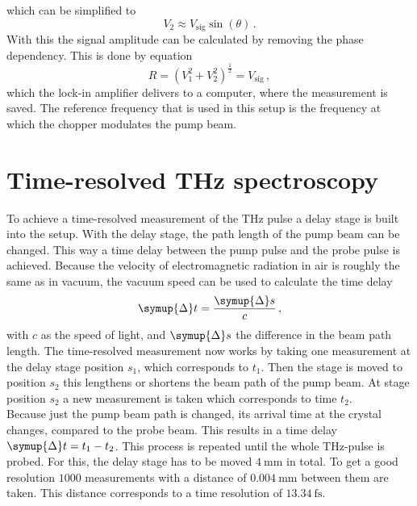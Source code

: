 which can be simplified to 
\begin{equation}
    V_2 \approx V_\text{sig} \sin(\theta)\,.
\end{equation}
With this the signal amplitude can be calculated by removing the phase dependency.
This is done by equation
\begin{equation}
    R = \left ( V_1^2+V_2^2 \right )^{\frac{1}{2}} = V_\text{sig} \, ,
\end{equation}
which the lock-in amplifier delivers to a computer, where the measurement is saved.
The reference frequency that is used in this setup is the frequency at which the chopper modulates the pump beam.
\section{Time-resolved THz spectroscopy}
\label{sec:time_domain}
To achieve a time-resolved measurement of the $\si{\tera\hertz}$ pulse a delay stage is built into the setup.
With the delay stage, the path length of the pump beam can be changed.
This way a time delay between the pump pulse and the probe pulse is achieved.
Because the velocity of electromagnetic radiation in air is roughly the same as in vacuum, the vacuum speed can be used to calculate the time delay   
\begin{equation}
    \symup{\Delta} t = \frac{\symup{\Delta} s}{c}\, ,
\end{equation}
with $c$ as the speed of light, and $\symup{\Delta} s$ the difference in the beam path length.
The time-resolved measurement now works by taking one measurement at the delay stage position $s_1$, which corresponds to $t_1$.
Then the stage is moved to position $s_2$ this lengthens or shortens the beam path of the pump beam.
At stage position $s_2$ a new measurement is taken which corresponds to time $t_2$.
\\
Because just the pump beam path is changed, its arrival time at the crystal changes, compared to the probe beam.
This results in a time delay $\symup{\Delta} t = t_1-t_2$.
This process is repeated until the whole $\si{\tera\hertz}$-pulse is probed.
For this, the delay stage has to be moved $\SI{4}{\milli\meter}$ in total.
To get a good resolution $1000$ measurements with a distance of $\SI{0.004}{\milli\meter}$ between them are taken.
This distance corresponds to a time resolution of $\SI{13.34}{\femto\second}$.

